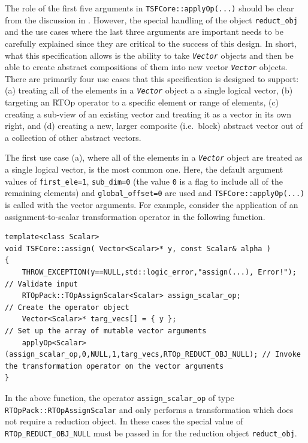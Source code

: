 \documentclass[10pt,fleqn]{article}
\begin{document}
The role of the first five arguments in \texttt{TSFCore::applyOp(...)}
should be clear from the discussion in \cite{ref:rtop_toms}.  However,
the special handling of the object \texttt{reduct\_obj} and the use
cases where the last three arguments are important needs to be
carefully explained since they are critical to the success of this
design.  In short, what this specification allows is the ability to
take \texttt{\textit{Vector}} objects and then be able to create
abstract compositions of them into new vector \texttt{\textit{Vector}}
objects.  There are primarily four use cases
\cite{ref:booch_et_al_1999} that this specification is designed to
support: (a) treating all of the elements in a
\texttt{\textit{Vector}} object a a single logical vector, (b)
targeting an RTOp operator to a specific element or range of elements,
(c) creating a sub-view of an existing vector and treating it as a
vector in its own right, and (d) creating a new, larger composite
(i.e.~block) abstract vector out of a collection of other abstract
vectors.

The first use case (a), where all of the elements in a
\texttt{\textit{Vector}} object are treated as a single logical
vector, is the most common one.  Here, the default argument values of
\texttt{first\_ele=1}, \texttt{sub\_dim=0} (the value \texttt{0} is a
flag to include all of the remaining elements) and
\texttt{global\_offset=0} are used and \texttt{TSFCore::applyOp(...)} is
called with the vector arguments.  For example, consider the
application of an assignment-to-scalar transformation operator
in the following function.

{\scriptsize\begin{verbatim}
template<class Scalar>
void TSFCore::assign( Vector<Scalar>* y, const Scalar& alpha )
{
    THROW_EXCEPTION(y==NULL,std::logic_error,"assign(...), Error!");           // Validate input
    RTOpPack::TOpAssignScalar<Scalar> assign_scalar_op;                        // Create the operator object
    Vector<Scalar>* targ_vecs[] = { y };                                       // Set up the array of mutable vector arguments
    applyOp<Scalar>(assign_scalar_op,0,NULL,1,targ_vecs,RTOp_REDUCT_OBJ_NULL); // Invoke the transformation operator on the vector arguments
}
\end{verbatim}}

In the above function, the operator \texttt{assign\_scalar\_op} of type
\texttt{RTOpPack::RTOpAssignScalar} and only
performs a transformation which does not require a reduction object.
In these cases the special value of \texttt{RTOp\_REDUCT\_OBJ\_NULL}
must be passed in for the reduction object \texttt{reduct\_obj}.
\end{document}
